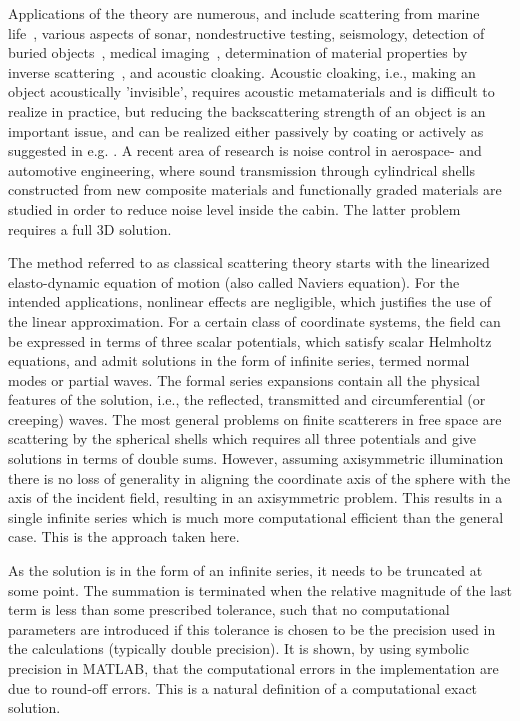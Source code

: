 Applications of the theory are numerous, and include scattering from marine life~\cite{Stanton1998dbs, Stanton2000asb, Anderson1950ssf}, various aspects of sonar, nondestructive testing, seismology, detection of buried objects~\cite{Sessarego1998sba}, medical imaging~\cite{Wells2006ui}, determination of material properties by inverse scattering~\cite{Ayres1987ias}, and acoustic cloaking. Acoustic cloaking, i.e., making an object acoustically 'invisible', requires acoustic metamaterials and is difficult to realize in practice, but reducing the backscattering strength of an object is an important issue, and can be realized either passively by coating or actively as suggested in e.g. \cite{Avital2015ssa}. 
A recent area of research is noise control in aerospace- and automotive engineering, where sound transmission through cylindrical shells constructed from new composite materials \cite{Talebitooti2016att} and functionally graded materials \cite{Daneshjou2017aes} are studied in order to reduce noise level inside the cabin. The latter problem requires a full 3D solution. %

The method referred to as classical scattering theory starts with the linearized elasto-dynamic equation of motion (also called Naviers equation). For the intended applications, nonlinear effects are negligible, which justifies the use of the linear approximation. For a certain class of coordinate systems, the field can be expressed in terms of three scalar potentials, which satisfy scalar Helmholtz equations, and admit solutions in the form of infinite series, termed normal modes or partial waves. The formal series expansions contain all the physical features of the solution, i.e., the reflected, transmitted and circumferential (or creeping) waves. The most general problems on finite scatterers in free space are scattering by the spherical shells which requires all three potentials and give solutions in terms of double sums. However, assuming axisymmetric illumination there is no loss of generality in aligning the coordinate axis of the sphere with the axis of the incident field, resulting in an axisymmetric problem. This results in a single infinite series which is much more computational efficient than the general case. This is the approach taken here.
 
As the solution is in the form of an infinite series, it needs to be truncated at some point. The summation is terminated when the relative magnitude of the last term is less than some prescribed tolerance, such that no computational parameters are introduced if this tolerance is chosen to be the precision used in the calculations (typically double precision). It is shown, by using symbolic precision in MATLAB, that the computational errors in the implementation are due to round-off errors. This is a natural definition of a computational exact solution.

